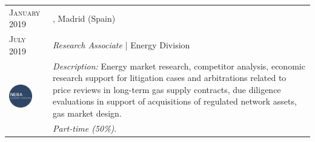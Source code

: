 \begin{longtable}{R{2.5cm}|p{14.8cm}}
	 	\textsc{January 2019} & \textsc{}, \faMapMarker \hspace{0.5 mm} Madrid (Spain) \\
 	\textsc{July 2019} 	& \textit{Research Associate} | Energy Division   \\
	 & 
 	\footnotesize{\faTasks \emph{ Description: }Energy market research, competitor analysis, economic research support for litigation cases and arbitrations related to price reviews in long-term gas supply contracts, due diligence evaluations in support of acquisitions of regulated network assets, gas market design.} \\ &
	\footnotesize{\faFileText \emph{ Part-time (50\%)}.} \\
	
\end{longtable}

\vspace{2 mm}

